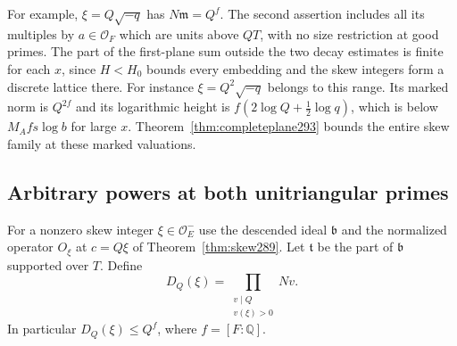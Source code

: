 \documentclass[a4paper,11pt]{article}
\theoremstyle{definition}
\theoremstyle{remark}
\numberwithin{equation}{section}
\begin{document}
For example, \(\xi=Q\sqrt{-q}\) has
\(N\mathfrak m=Q^f\). The second assertion includes all
its multiples by \(a\in\mathcal O_F\) which are units above
\(QT\), with no size restriction at good primes.
The part of the first-plane sum outside the two decay
estimates is finite for each \(x\), since \(H<H_0\) bounds
every embedding and the skew integers form a discrete
lattice there. For instance \(\xi=Q^2\sqrt{-q}\) belongs to
this range. Its marked norm is \(Q^{2f}\) and its logarithmic height
is \(f(2\log Q+\tfrac12\log q)\), which is below
\(M_A f s\log b\) for large \(x\). Theorem~\ref{thm:completeplane293} bounds the entire skew family at these marked valuations.

\subsection{Arbitrary powers at both unitriangular primes}\label{nav:IX-55}
For a nonzero skew integer \(\xi\in\mathcal O_E^-\) use
the descended ideal \(\mathfrak b\) and the normalized
operator \(O_\xi\) at \(c=Q\xi\) of
Theorem~\ref{thm:skew289}. Let \(\mathfrak t\) be the
part of \(\mathfrak b\) supported over \(T\). Define
\[
 D_Q(\xi)=\prod_{\substack{v\mid Q\\v(\xi)>0}}Nv .
\]
In particular \(D_Q(\xi)\le Q^f\), where \(f=[F:\mathbb Q]\).
\end{document}
